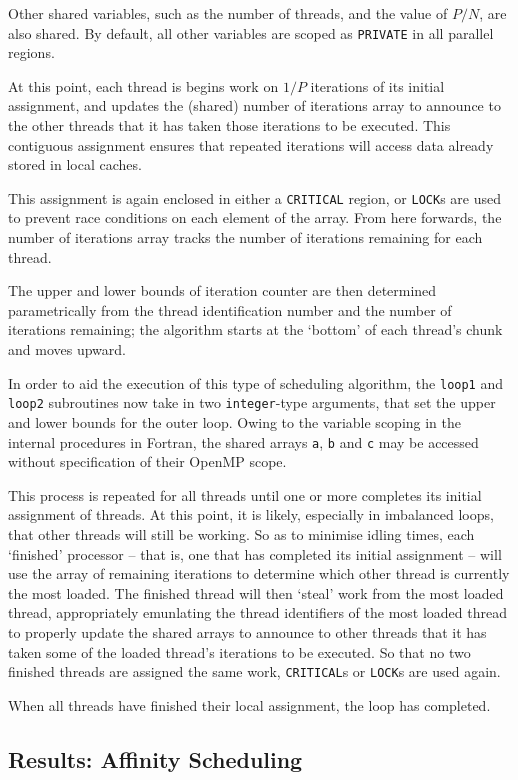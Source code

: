 \documentclass{article} %
\newcommand{\tp}{\texttt}
\begin{document}
Other shared variables, such as the number of threads, and the value of $P/N$, are also shared.
By default, all other variables are scoped as \tp{PRIVATE} in all parallel regions.

At this point, each thread is begins work on $1/P$ iterations of its initial assignment, and updates the (shared) number of iterations array to announce to the other threads that it has taken those iterations to be executed.
This contiguous assignment ensures that repeated iterations will access data already stored in local caches.

This assignment is again enclosed in either a \tp{CRITICAL} region, or \tp{LOCK}s are used to prevent race conditions on each element of the array.
From here forwards, the number of iterations array tracks the number of iterations remaining for each thread.

The upper and lower bounds of iteration counter are then determined parametrically from the thread identification number and the number of iterations remaining; the algorithm starts at the `bottom' of each thread's chunk and moves upward.

In order to aid the execution of this type of scheduling algorithm, the \tp{loop1} and \tp{loop2} subroutines now take in two \tp{integer}-type arguments, that set the upper and lower bounds for the outer loop.
Owing to the variable scoping in the internal procedures in Fortran, the shared arrays \tp{a}, \tp{b} and \tp{c} may be accessed without specification of their OpenMP scope.

This process is repeated for all threads until one or more completes its initial assignment of threads.
At this point, it is likely, especially in imbalanced loops, that other threads will still be working.
So as to minimise idling times, each `finished' processor -- that is, one that has completed its initial assignment -- will use the array of remaining iterations to determine which other thread is currently the most loaded.
The finished thread will then `steal' work from the most loaded thread, appropriately emunlating the thread identifiers of the most loaded thread to properly update the shared arrays to announce to other threads that it has taken some of the loaded thread's iterations to be executed.
So that no two finished threads are assigned the same work, \tp{CRITICAL}s or \tp{LOCK}s are used again.

When all threads have finished their local assignment, the loop has completed.

\subsection*{Results: Affinity Scheduling}
\end{document}
